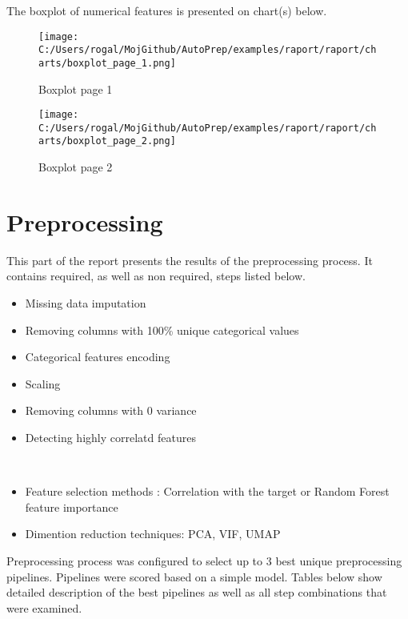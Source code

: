 \documentclass{article}%
\begin{document}
%
The boxplot of numerical features is presented on chart(s) below.%


\begin{figure}[H]%
\centering%
\texttt{[image: C:/Users/rogal/MojGithub/AutoPrep/examples/raport/raport/charts/boxplot\_page\_1.png]}%
\caption{Boxplot page 1}%
\label{Boxplot page 1}%
\end{figure}

%


\begin{figure}[H]%
\centering%
\texttt{[image: C:/Users/rogal/MojGithub/AutoPrep/examples/raport/raport/charts/boxplot\_page\_2.png]}%
\caption{Boxplot page 2}%
\label{Boxplot page 2}%
\end{figure}

%
\section{Preprocessing}%
\label{sec:Preprocessing}%

%
This part of the report presents the results of the preprocessing process. It contains required, as well as non required, steps listed below. 
%
\\ %
\begin{itemize}%
\item%
Missing data imputation%
\item%
Removing columns with 100\% unique categorical values%
\item%
Categorical features encoding%
\item%
Scaling%
\item%
Removing columns with 0 variance%
\item%
Detecting highly correlatd features%
\end{itemize}%
\\ %
\begin{itemize}%
\item%
Feature selection methods : Correlation with the target or Random Forest feature importance%
\item%
Dimention reduction techniques: PCA, VIF, UMAP%
\end{itemize}%
Preprocessing process was configured to select up to 3 best unique preprocessing pipelines. Pipelines were scored based on a simple model. Tables below show detailed description of the best pipelines as well as all step combinations that were examined. 
%
\end{document}
